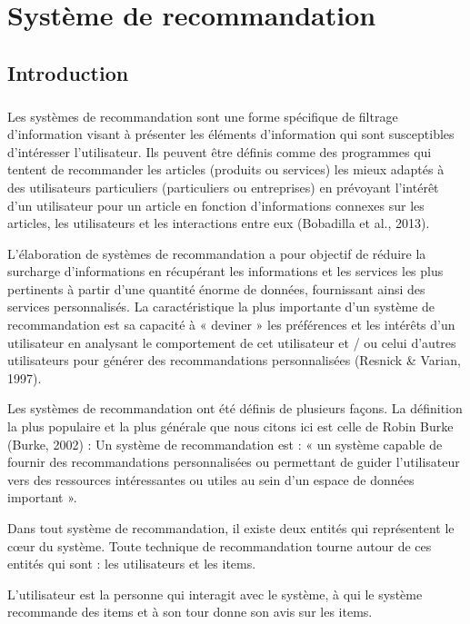 \chapter{Système de recommandation}
\section*{Introduction}
{}
\paragraph{}
Les systèmes de recommandation sont une forme spécifique de filtrage d’information visant à
présenter les éléments d'information qui sont susceptibles d'intéresser l'utilisateur. Ils peuvent être
définis comme des programmes qui tentent de recommander les articles (produits ou services) les
mieux adaptés à des utilisateurs particuliers (particuliers ou entreprises) en prévoyant l'intérêt d'un
utilisateur pour un article en fonction d'informations connexes sur les articles, les utilisateurs et les
interactions entre eux (Bobadilla et al., 2013).

L’élaboration de systèmes de recommandation a pour objectif de réduire la surcharge
d’informations en récupérant les informations et les services les plus pertinents à partir d’une
quantité énorme de données, fournissant ainsi des services personnalisés. La caractéristique la plus
importante d'un système de recommandation est sa capacité à « deviner » les préférences et les
intérêts d'un utilisateur en analysant le comportement de cet utilisateur et / ou celui d'autres
utilisateurs pour générer des recommandations personnalisées (Resnick \& Varian, 1997).

Les systèmes de recommandation ont été définis de plusieurs façons. La définition la plus populaire
et la plus générale que nous citons ici est celle de Robin Burke (Burke, 2002) :
Un système de recommandation est : « un système capable de fournir des recommandations
personnalisées ou permettant de guider l’utilisateur vers des ressources intéressantes ou utiles au
sein d’un espace de données important ».

Dans tout système de recommandation, il existe deux entités qui représentent le cœur du système.
Toute technique de recommandation tourne autour de ces entités qui sont : les utilisateurs et les
items.

L’utilisateur est la personne qui interagit avec le système, à qui le système recommande des items
et à son tour donne son avis sur les items.

